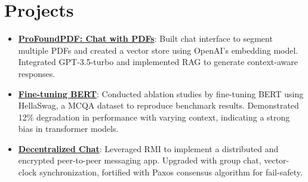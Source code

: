 \documentclass[letterpaper,10pt]{article}
\newcommand{\resumeItem}[2]{
    \item\small{
        \textbf{#1}{: #2 \vspace{-2pt}}
    }
}
\newcommand{\resumeSubItem}[2]{\resumeItem{#1}{#2}\vspace{-4pt}}
\newcommand{\resumeSubHeadingListStart}{\begin{itemize}[leftmargin=*]}
\newcommand{\resumeSubHeadingListEnd}{\end{itemize}}
\begin{document}
\section{Projects}
	\resumeSubHeadingListStart
		\resumeSubItem{\href{https://github.com/killerpanda101/ProfoundPDF}{ProFoundPDF: Chat with PDFs}}
			{Built chat interface to segment multiple PDFs and created a vector store using OpenAI’s embedding model. Integrated GPT-3.5-turbo and implemented RAG to generate context-aware responses.}
		\resumeSubItem{\href{https://expo.baulab.info/2023-Fall/chandrakommineni/}{Fine-tuning BERT}}
			{Conducted ablation studies by fine-tuning BERT using HellaSwag, a MCQA dataset to reproduce benchmark results. Demonstrated 12\% degradation in performance with varying context, indicating a strong bias in transformer models.}
		\resumeSubItem{\href{https://github.com/chakrabortyde/decentralized-chat}{Decentralized Chat}}
			{Leveraged RMI to implement a distributed and encrypted peer-to-peer messaging app. Upgraded with group chat, vector-clock synchronization, fortified with Paxos consensus algorithm for fail-safety.}
	\resumeSubHeadingListEnd\texttt{}
\end{document}
